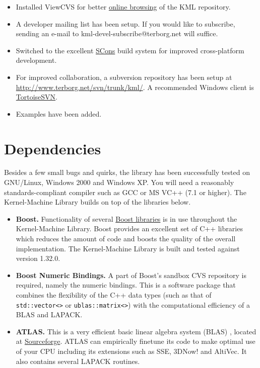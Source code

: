 \documentclass{article}
\begin{document}
\begin{itemize}

\item Installed ViewCVS for better 
\href{http://www.terborg.net/cgi-bin/viewcvs.cgi/trunk/kml/}{online browsing}
of the KML repository.
\item A developer mailing list has been setup. If you would like to subscribe, sending an
e-mail to kml-devel-subscribe@terborg.net will suffice.
\item Switched to the excellent \href{http://www.scons.org/}{SCons} build system for 
improved cross-platform development.
\item For improved collaboration, a subversion repository has been 
setup at \href{http://www.terborg.net/svn/trunk/kml/}{http://www.terborg.net/svn/trunk/kml/}. A
recommended Windows client is \href{http://tortoisesvn.tigris.org/}{TortoiseSVN}.
\item Examples have been added.

\end{itemize}

\section*{Dependencies}

Besides a few small bugs and quirks, the library has been successfully tested 
on GNU/Linux, Windows 2000 and Windows XP. You will need a reasonably
standards-compliant compiler such as GCC or MS VC++ (7.1 or higher).  
The Kernel-Machine Library builds on top of the libraries below.

\begin{itemize}
\item \textbf{Boost.} Functionality of several \href{http://www.boost.org}{Boost libraries} is 
in use throughout the Kernel-Machine Library. Boost provides
an excellent set of C++ libraries which reduces the amount of code and boosts the quality of the overall implementation.
The Kernel-Machine Library is built and tested against version 1.32.0.

\item \textbf{Boost Numeric Bindings.} A part of Boost's sandbox CVS repository is required, namely the numeric bindings. 
This is a software package that combines the flexibility of the C++ data types (such as that of 
\texttt{std::vector<>} or \texttt{ublas::matrix<>}) with the computational 
efficiency of a BLAS and LAPACK.  

\item \textbf{ATLAS.} This is a very efficient basic linear algebra system (BLAS) \citep{whaley01automated}, located at
\href{http://math-atlas.sourceforge.net}{Sourceforge}. ATLAS can empirically finetune its code to make optimal use of your CPU 
including its extensions such as SSE, 3DNow! and AltiVec. It also contains several LAPACK routines. 

\end{itemize}
\end{document}
